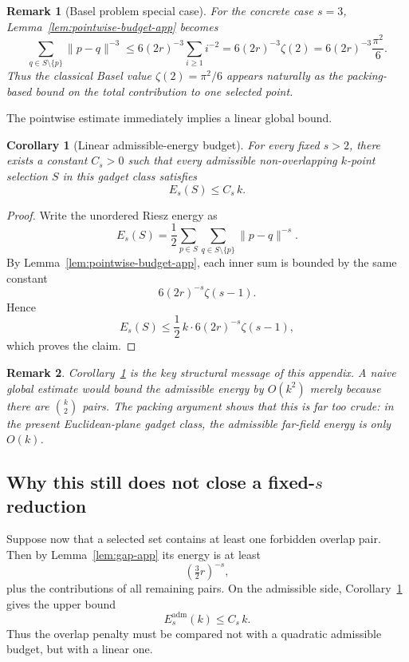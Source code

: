\documentclass[11pt]{article}
\newtheorem{remark}{Remark}
\newtheorem{corollary}{Corollary}
\begin{document}
\begin{remark}[Basel problem special case]
\label{rem:basel-app}
For the concrete case $s=3$, Lemma~\ref{lem:pointwise-budget-app} becomes
\[
\sum_{q\in S\setminus\{p\}} \|p-q\|^{-3}
\le
6(2r)^{-3}\sum_{i\ge 1} i^{-2}
=
6(2r)^{-3}\zeta(2)
=
6(2r)^{-3}\frac{\pi^2}{6}.
\]
Thus the classical Basel value $\zeta(2)=\pi^2/6$ appears naturally as the packing-based bound on the total contribution to one selected point.
\end{remark}

The pointwise estimate immediately implies a linear global bound.

\begin{corollary}[Linear admissible-energy budget]
\label{cor:linear-budget-app}
For every fixed $s>2$, there exists a constant $C_s>0$ such that every admissible non-overlapping $k$-point selection $S$ in this gadget class satisfies
\[
E_s(S)\le C_s\,k.
\]
\end{corollary}

\begin{proof}
Write the unordered Riesz energy as
\[
E_s(S)
=
\frac12\sum_{p\in S}\sum_{q\in S\setminus\{p\}}\|p-q\|^{-s}.
\]
By Lemma~\ref{lem:pointwise-budget-app}, each inner sum is bounded by the same constant
\[
6(2r)^{-s}\zeta(s-1).
\]
Hence
\[
E_s(S)\le
\frac12\,k\cdot 6(2r)^{-s}\zeta(s-1),
\]
which proves the claim.
\end{proof}

\begin{remark}
Corollary~\ref{cor:linear-budget-app} is the key structural message of this appendix. A naive global estimate would bound the admissible energy by $O(k^2)$ merely because there are $\binom{k}{2}$ pairs. The packing argument shows that this is far too crude: in the present Euclidean-plane gadget class, the admissible far-field energy is only $O(k)$.
\end{remark}

\subsection{Why this still does not close a fixed-$s$ reduction}

Suppose now that a selected set contains at least one forbidden overlap pair. Then by Lemma~\ref{lem:gap-app} its energy is at least
\[
\left(\tfrac{3}{2}r\right)^{-s},
\]
plus the contributions of all remaining pairs. On the admissible side, Corollary~\ref{cor:linear-budget-app} gives the upper bound
\[
E_s^{\mathrm{adm}}(k)\le C_s\,k.
\]
Thus the overlap penalty must be compared not with a quadratic admissible budget, but with a linear one.
\end{document}

